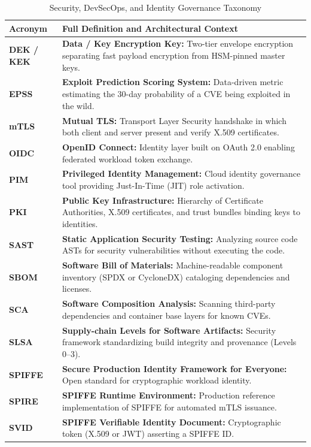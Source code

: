 \documentclass[11pt,oneside]{book}
\begin{document}
\begin{table}[htbp]
\centering\small
\begin{tabular}{lp{9.5cm}}
\toprule
\textbf{Acronym} & \textbf{Full Definition and Architectural Context} \\
\midrule
\textbf{DEK / KEK} & \textbf{Data / Key Encryption Key:} Two-tier envelope encryption separating fast payload encryption from HSM-pinned master keys. \\
\textbf{EPSS} & \textbf{Exploit Prediction Scoring System:} Data-driven metric estimating the 30-day probability of a CVE being exploited in the wild. \\
\textbf{mTLS} & \textbf{Mutual TLS:} Transport Layer Security handshake in which both client and server present and verify X.509 certificates. \\
\textbf{OIDC} & \textbf{OpenID Connect:} Identity layer built on OAuth 2.0 enabling federated workload token exchange. \\
\textbf{PIM} & \textbf{Privileged Identity Management:} Cloud identity governance tool providing Just-In-Time (JIT) role activation. \\
\textbf{PKI} & \textbf{Public Key Infrastructure:} Hierarchy of Certificate Authorities, X.509 certificates, and trust bundles binding keys to identities. \\
\textbf{SAST} & \textbf{Static Application Security Testing:} Analyzing source code ASTs for security vulnerabilities without executing the code. \\
\textbf{SBOM} & \textbf{Software Bill of Materials:} Machine-readable component inventory (SPDX or CycloneDX) cataloging dependencies and licenses. \\
\textbf{SCA} & \textbf{Software Composition Analysis:} Scanning third-party dependencies and container base layers for known CVEs. \\
\textbf{SLSA} & \textbf{Supply-chain Levels for Software Artifacts:} Security framework standardizing build integrity and provenance (Levels 0--3). \\
\textbf{SPIFFE} & \textbf{Secure Production Identity Framework for Everyone:} Open standard for cryptographic workload identity. \\
\textbf{SPIRE} & \textbf{SPIFFE Runtime Environment:} Production reference implementation of SPIFFE for automated mTLS issuance. \\
\textbf{SVID} & \textbf{SPIFFE Verifiable Identity Document:} Cryptographic token (X.509 or JWT) asserting a SPIFFE ID. \\
\bottomrule
\end{tabular}
\caption{Security, DevSecOps, and Identity Governance Taxonomy}
\label{tab:v3-sec-taxonomy}
\end{table}
\end{document}
